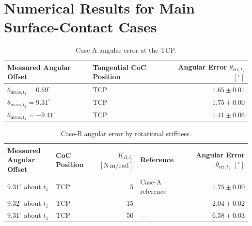 \chapter{Numerical Results for Main Surface-Contact Cases}
\label{app:additional_plots}
\label{app:supporting_contact_checks}

\label{sec:appendix_main_contact_values}


\begin{table}[H]
\centering
\small
\caption{Case-A angular error at the TCP.}
\label{tab:results_case_a}
\begin{tabular}{@{}llr@{}}
\toprule
Measured Angular Offset & Tangential CoC Position &
    Angular Error \(\theta_{\mathrm{err},t_1}\) \([{}^\circ]\) \\
\midrule
\(\theta_{\mathrm{meas},t_1}=0.69^\circ\) & TCP & \(1.65\pm0.01\) \\
\(\theta_{\mathrm{meas},t_1}=9.31^\circ\) & TCP & \(1.75\pm0.00\) \\
\(\theta_{\mathrm{meas},t_1}=-9.41^\circ\) & TCP & \(1.41\pm0.06\) \\
\bottomrule
\end{tabular}
\end{table}

\begin{table}[H]
\centering
\small
\caption{Case-B angular error by rotational stiffness.}
\label{tab:results_case_b}
\begin{tabular}{@{}llrlr@{}}
\toprule
\shortstack[l]{Measured\\Angular Offset} & \shortstack[l]{CoC\\Position} &
\(K_{R,t_1}\) \([\mathrm{N\,m/rad}]\) &
Reference &
    Angular Error \(\theta_{\mathrm{err},t_1}\) \([{}^\circ]\) \\
\midrule
\(9.31^\circ\) about \(t_1\) & TCP & 5 & Case-A reference & \(1.75\pm0.00\) \\
\(9.32^\circ\) about \(t_1\) & TCP & 15 & --- & \(2.04\pm0.02\) \\
\(9.31^\circ\) about \(t_1\) & TCP & 50 & --- & \(6.58\pm0.03\) \\
\bottomrule
\end{tabular}
\end{table}

